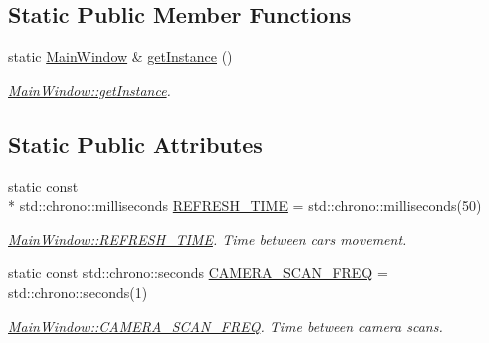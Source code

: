 \subsection*{Static Public Member Functions}
\begin{DoxyCompactItemize}
\item 
static \hyperlink{classMainWindow}{Main\-Window} \& \hyperlink{classMainWindow_a17b66394011720014a82ed3457a48bd3}{get\-Instance} ()
\begin{DoxyCompactList}\small\item\em \hyperlink{classMainWindow_a17b66394011720014a82ed3457a48bd3}{Main\-Window\-::get\-Instance}. \end{DoxyCompactList}\end{DoxyCompactItemize}
\subsection*{Static Public Attributes}
\begin{DoxyCompactItemize}
\item 
\hypertarget{classMainWindow_ac52c27e88f64214983e13638b1c73e80}{static const \\*
std\-::chrono\-::milliseconds \hyperlink{classMainWindow_ac52c27e88f64214983e13638b1c73e80}{R\-E\-F\-R\-E\-S\-H\-\_\-\-T\-I\-M\-E} = std\-::chrono\-::milliseconds(50)}\label{classMainWindow_ac52c27e88f64214983e13638b1c73e80}

\begin{DoxyCompactList}\small\item\em \hyperlink{classMainWindow_ac52c27e88f64214983e13638b1c73e80}{Main\-Window\-::\-R\-E\-F\-R\-E\-S\-H\-\_\-\-T\-I\-M\-E}. Time between cars movement. \end{DoxyCompactList}\item 
\hypertarget{classMainWindow_a1e3a4f8c96328a2f84b8382649d04967}{static const std\-::chrono\-::seconds \hyperlink{classMainWindow_a1e3a4f8c96328a2f84b8382649d04967}{C\-A\-M\-E\-R\-A\-\_\-\-S\-C\-A\-N\-\_\-\-F\-R\-E\-Q} = std\-::chrono\-::seconds(1)}\label{classMainWindow_a1e3a4f8c96328a2f84b8382649d04967}

\begin{DoxyCompactList}\small\item\em \hyperlink{classMainWindow_a1e3a4f8c96328a2f84b8382649d04967}{Main\-Window\-::\-C\-A\-M\-E\-R\-A\-\_\-\-S\-C\-A\-N\-\_\-\-F\-R\-E\-Q}. Time between camera scans. \end{DoxyCompactList}\end{DoxyCompactItemize}


